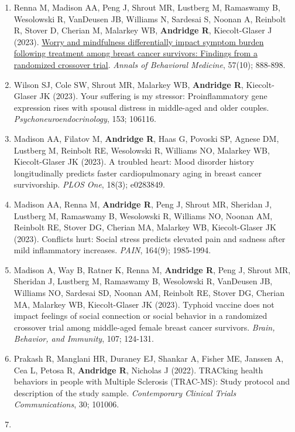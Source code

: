 \documentclass[
  english,
  letterpaper,
  DIV=11,
  numbers=noendperiod]{scrartcl}
\begin{document}
\begin{enumerate}
  \emph{Infant and Child Development}, 32(5); e2447.
\item
  Renna M, Madison AA, Peng J, Shrout MR, Lustberg M, Ramaswamy B,
  Wesolowski R, VanDeusen JB, Williams N, Sardesai S, Noonan A, Reinbolt
  R, Stover D, Cherian M, Malarkey WB, \textbf{Andridge R},
  Kiecolt-Glaser J (2023).
  \href{https://pubmed.ncbi.nlm.nih.gov/37335884/}{Worry and mindfulness
  differentially impact symptom burden following treatment among breast
  cancer survivors: Findings from a randomized crossover trial}.
  \emph{Annals of Behavioral Medicine}, 57(10); 888-898.
\item
  Wilson SJ, Cole SW, Shrout MR, Malarkey WB, \textbf{Andridge R},
  Kiecolt-Glaser JK (2023). Your suffering is my stressor:
  Proinflammatory gene expression rises with spousal distress in
  middle-aged and older couples. \emph{Psychoneuroendocrinology}, 153;
  106116.
\item
  Madison AA, Filatov M, \textbf{Andridge R}, Haas G, Povoski SP, Agnese
  DM, Lustberg M, Reinbolt RE, Wesolowski R, Williams NO, Malarkey WB,
  Kiecolt-Glaser JK (2023). A troubled heart: Mood disorder history
  longitudinally predicts faster cardiopulmonary aging in breast cancer
  survivorship. \emph{PLOS One}, 18(3); e0283849.
\item
  Madison AA, Renna M, \textbf{Andridge R}, Peng J, Shrout MR, Sheridan
  J, Lustberg M, Ramaswamy B, Wesolowski R, Williams NO, Noonan AM,
  Reinbolt RE, Stover DG, Cherian MA, Malarkey WB, Kiecolt-Glaser JK
  (2023). Conflicts hurt: Social stress predicts elevated pain and
  sadness after mild inflammatory increases. \emph{PAIN}, 164(9);
  1985-1994.
\item
  Madison A, Way B, Ratner K, Renna M, \textbf{Andridge R}, Peng J,
  Shrout MR, Sheridan J, Lustberg M, Ramaswamy B, Wesolowski R,
  VanDeusen JB, Williams NO, Sardesai SD, Noonan AM, Reinbolt RE, Stover
  DG, Cherian MA, Malarkey WB, Kiecolt-Glaser JK (2023). Typhoid vaccine
  does not impact feelings of social connection or social behavior in a
  randomized crossover trial among middle-aged female breast cancer
  survivors. \emph{Brain, Behavior, and Immunity}, 107; 124-131.
\item
  Prakash R, Manglani HR, Duraney EJ, Shankar A, Fisher ME, Janssen A,
  Cea L, Petosa R, \textbf{Andridge R}, Nicholas J (2022). TRACking
  health behaviors in people with Multiple Sclerosis (TRAC-MS): Study
  protocol and description of the study sample. \emph{Contemporary
  Clinical Trials Communications}, 30; 101006.
\item

\end{enumerate}
\end{document}
